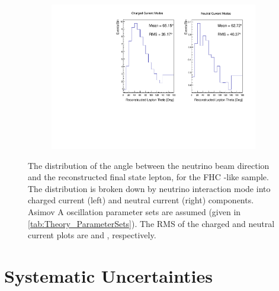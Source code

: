 \begin{figure}[h]
  \begin{subfigure}[t]{\textwidth}
    \includegraphics[width=\textwidth, trim={0mm 0mm 0mm 0mm}, clip,page=1]{Figures/Selections/1DSpectra_FHC1Re-2020.pdf}
  \end{subfigure}
  \caption{The distribution of the angle between the neutrino beam direction and the reconstructed final state lepton, for the FHC -like sample. The distribution is broken down by neutrino interaction mode into charged current (left) and neutral current (right) components. Asimov A oscillation parameter sets are assumed (given in \autoref{tab:Theory_ParameterSets}). The RMS of the charged and neutral current plots are \quickmath{35.17\degree} and \quickmath{40.37\degree}, respectively.}
  \label{fig:SelsAndSysts_Beam_FHC1ReThetaSpectra}
\end{figure}

\clearpage
\section{Systematic Uncertainties}
\label{sec:SelsAndSysts_Systs}

